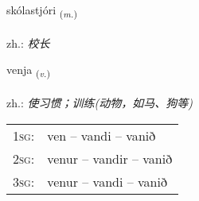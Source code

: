 \documentclass[frontgrid, backgrid]{flacards}\usepackage[]{graphicx}\usepackage[]{xcolor}
\begin{document}
\renewcommand{\blhead}{\vskip5pt {\small\bfseries\footnotesize Nafnorð | 名词 }}
\renewcommand{\bcfoot}{\vskip5pt \hspace{2pt}{\small\bfseries\footnotesize 3K}}


{skólastjóri \small{\textsubscript{(\textit{m.})}} \\[1ex] %
\textphonetic{[skouːlastjourɪ]} \\
zh.: \emph{校长} \\  [2ex]
\renewcommand*{\arraystretch}{0.8}
}

\renewcommand{\flhead}{\vskip5pt \fboxsep=0pt {\small\bfseries\footnotesize Sagnorð | 动词}}
\renewcommand{\fcfoot}{\vskip5pt \fboxsep=0pt \hspace{2pt}{\small\bfseries\footnotesize 3K}}

\renewcommand{\blhead}{\vskip5pt {\small\bfseries\footnotesize Sagnorð | 动词 }}
\renewcommand{\bcfoot}{\vskip5pt \hspace{2pt}{\small\bfseries\footnotesize 3K}}


{venja \small{\textsubscript{(\textit{v.})}} \\[1ex] %
\textphonetic{[vɛnja]} \\
zh.: \emph{使习惯；训练(动物，如马、狗等)} \\  [2ex]
\renewcommand*{\arraystretch}{0.8}
\begin{tabular}{p{1cm}l}
\textsc{1sg}: & ven -- vandi -- vanið \\ 
\textsc{2sg}: & venur -- vandir -- vanið \\ 
\textsc{3sg}: & venur -- vandi -- vanið \\ 
\end{tabular}
}
\end{document}
